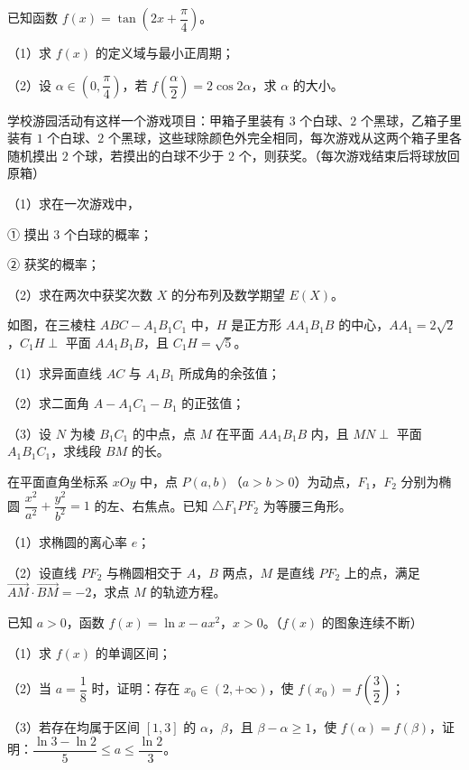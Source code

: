 \begin{question}
已知函数 $f(x)=\tan\left(2x+\dfrac{\pi}{4}\right)$。

（1）求 $f(x)$ 的定义域与最小正周期；

（2）设 $\alpha\in\left(0,\dfrac{\pi}{4}\right)$，若 $f\left(\dfrac{\alpha}{2}\right)=2\cos2\alpha$，求 $\alpha$ 的大小。

\end{question}
\begin{question}
学校游园活动有这样一个游戏项目：甲箱子里装有 $3$ 个白球、$2$ 个黑球，乙箱子里装有 $1$ 个白球、$2$ 个黑球，这些球除颜色外完全相同，每次游戏从这两个箱子里各随机摸出 $2$ 个球，若摸出的白球不少于 $2$ 个，则获奖。（每次游戏结束后将球放回原箱）

（1）求在一次游戏中，

① 摸出 $3$ 个白球的概率；

② 获奖的概率；

（2）求在两次中获奖次数 $X$ 的分布列及数学期望 $E(X)$。

\Needspace{0.4\textheight}
\end{question}
\begin{question}
如图，在三棱柱 $ABC-A_1B_1C_1$ 中，$H$ 是正方形 $AA_1B_1B$ 的中心，$AA_1=2\sqrt2$，$C_1H\perp$ 平面 $AA_1B_1B$，且 $C_1H=\sqrt5$。

（1）求异面直线 $AC$ 与 $A_1B_1$ 所成角的余弦值；

（2）求二面角 $A-A_1C_1-B_1$ 的正弦值；

（3）设 $N$ 为棱 $B_1C_1$ 的中点，点 $M$ 在平面 $AA_1B_1B$ 内，且 $MN\perp$ 平面 $A_1B_1C_1$，求线段 $BM$ 的长。
\nopagebreak[4]
\begin{center}\end{center}
\nopagebreak[4]
\end{question}
\begin{question}
在平面直角坐标系 $xOy$ 中，点 $P(a,b)$（$a>b>0$）为动点，$F_1$，$F_2$ 分别为椭圆 $\dfrac{x^2}{a^2}+\dfrac{y^2}{b^2}=1$ 的左、右焦点。已知 $\triangle F_1PF_2$ 为等腰三角形。

（1）求椭圆的离心率 $e$；

（2）设直线 $PF_2$ 与椭圆相交于 $A$，$B$ 两点，$M$ 是直线 $PF_2$ 上的点，满足 $\overrightarrow{AM}\cdot\overrightarrow{BM}=-2$，求点 $M$ 的轨迹方程。

\end{question}
\begin{question}
已知 $a>0$，函数 $f(x)=\ln x-ax^2$，$x>0$。（$f(x)$ 的图象连续不断）

（1）求 $f(x)$ 的单调区间；

（2）当 $a=\dfrac18$ 时，证明：存在 $x_0\in(2,+\infty)$，使 $f(x_0)=f\left(\dfrac32\right)$；

（3）若存在均属于区间 $[1,3]$ 的 $\alpha$，$\beta$，且 $\beta-\alpha\geqslant1$，使 $f(\alpha)=f(\beta)$，证明：$\dfrac{\ln3-\ln2}{5}\leqslant a\leqslant\dfrac{\ln2}{3}$。

\end{question}
